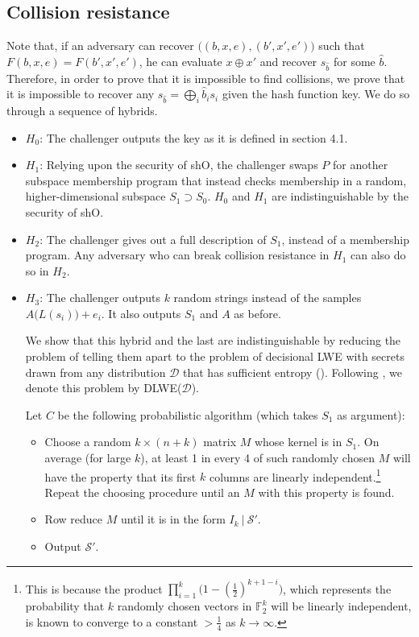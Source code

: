\documentclass{article}
\begin{document}
\subsection{Collision resistance}
Note that, if an adversary can recover $\big( (b, x, e), (b', x', e') \big)$ such that $F(b, x, e) = F(b', x', e')$, he can evaluate $x \oplus x'$ and recover $s_{\hat b}$ for some $\hat b$. Therefore, in order to prove that it is impossible to find collisions, we prove that it is impossible to recover any $s_{\hat b} = \bigoplus_i \hat b_is_i$ given the hash function key. We do so through a sequence of hybrids.

\begin{itemize}
    \item $H_0$: The challenger outputs the key as it is defined in section 4.1.
    \item $H_1$: Relying upon the security of \textsf{shO}, the challenger swaps $P$ for another subspace membership program that instead checks membership in a random, higher-dimensional subspace $S_1 \supset S_0$. $H_0$ and $H_1$ are indistinguishable by the security of \textsf{shO}.
    \item $H_2$: The challenger gives out a full description of $S_1$, instead of a membership program. Any adversary who can break collision resistance in $H_1$ can also do so in $H_2$.
    \item $H_3$: The challenger outputs $k$ random strings instead of the samples $A\big( L(s_i) \big) + e_i$. It also outputs $S_1$ and $A$ as before.

We show that this hybrid and the last are indistinguishable by reducing the problem of telling them apart to the problem of decisional LWE with secrets drawn from any distribution $\mathcal{D}$ that has sufficient entropy (\cite{robustness}). Following \cite{robustness}, we denote this problem by \textsf{DLWE}($\mathcal{D}$).

	  Let $C$ be the following probabilistic algorithm (which takes $S_1$ as argument):
    \begin{itemize}
        \item Choose a random $k \times (n+k)$ matrix $M$ whose kernel is in $S_1$. On average (for large $k$), at least 1 in every 4 of such randomly chosen $M$ will have the property that its first $k$ columns are linearly independent.\footnote{This is because the product $\prod_{i=1}^k \big(1-(\frac{1}{2})^{k+1-i}\big)$, which represents the probability that $k$ randomly chosen vectors in $\mathbb{F}_2^k$ will be linearly independent, is known to converge to a constant $ > \frac{1}{4}$ as $k \rightarrow \infty$.} Repeat the choosing procedure until an $M$ with this property is found.
        \item Row reduce $M$ until it is in the form $I_k \: | \: \mathcal{S}'$.
        \item Output $\mathcal{S}'$.
    \end{itemize}


\end{itemize}
\end{document}
